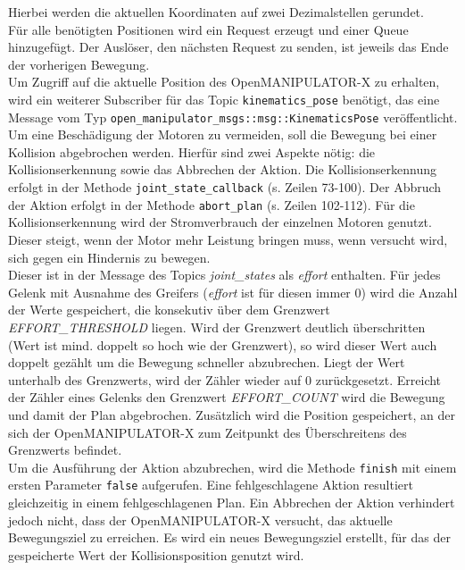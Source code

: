 Hierbei werden die aktuellen Koordinaten auf zwei Dezimalstellen gerundet.\\
Für alle benötigten Positionen wird ein Request erzeugt und einer Queue hinzugefügt.
Der Auslöser, den nächsten Request zu senden, ist jeweils das Ende der vorherigen Bewegung.\\
Um Zugriff auf die aktuelle Position des OpenMANIPULATOR-X zu erhalten, wird ein weiterer Subscriber für das Topic \verb|kinematics_pose| benötigt, das eine Message vom Typ \verb|open_manipulator_msgs::msg::KinematicsPose| veröffentlicht.\\
Um eine Beschädigung der Motoren zu vermeiden, soll die Bewegung bei einer Kollision abgebrochen werden.
Hierfür sind zwei Aspekte nötig: die Kollisionserkennung sowie das Abbrechen der Aktion.
Die Kollisionserkennung erfolgt in der Methode \verb|joint_state_callback| (s. Zeilen 73-100).
Der Abbruch der Aktion erfolgt in der Methode \verb|abort_plan| (s. Zeilen 102-112).
Für die Kollisionserkennung wird der Stromverbrauch der einzelnen Motoren genutzt.
Dieser steigt, wenn der Motor mehr Leistung bringen muss, wenn versucht wird, sich gegen ein Hindernis zu bewegen.\\
Dieser ist in der Message des Topics \emph{joint\_states} als \emph{effort} enthalten.
Für jedes Gelenk mit Ausnahme des Greifers (\emph{effort} ist für diesen immer 0) wird die Anzahl der Werte gespeichert, die konsekutiv über dem Grenzwert \emph{EFFORT\_THRESHOLD} liegen.
Wird der Grenzwert deutlich überschritten (Wert ist mind. doppelt so hoch wie der Grenzwert), so wird dieser Wert auch doppelt gezählt um die Bewegung schneller abzubrechen.
Liegt der Wert unterhalb des Grenzwerts, wird der Zähler wieder auf 0 zurückgesetzt.
Erreicht der Zähler eines Gelenks den Grenzwert \emph{EFFORT\_COUNT} wird die Bewegung und damit der Plan abgebrochen.
Zusätzlich wird die Position gespeichert, an der sich der OpenMANIPULATOR-X zum Zeitpunkt des Überschreitens des Grenzwerts befindet.\\
Um die Ausführung der Aktion abzubrechen, wird die Methode \verb|finish| mit einem ersten Parameter \verb|false| aufgerufen.
Eine fehlgeschlagene Aktion resultiert gleichzeitig in einem fehlgeschlagenen Plan.
Ein Abbrechen der Aktion verhindert jedoch nicht, dass der OpenMANIPULATOR-X versucht, das aktuelle Bewegungsziel zu erreichen.
Es wird ein neues Bewegungsziel erstellt, für das der gespeicherte Wert der Kollisionsposition genutzt wird.

